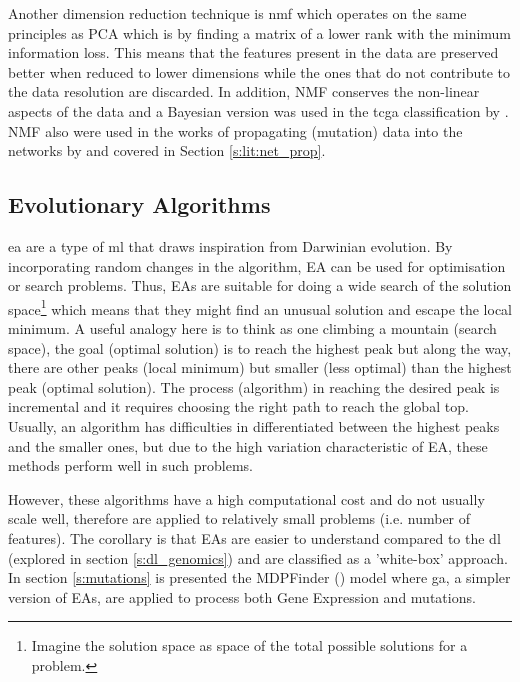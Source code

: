 Another dimension reduction technique is \acrfull{nmf} which operates on the same principles as PCA which is by finding a matrix of a lower rank with the minimum information loss. This means that the features present in the data are preserved better when reduced to lower dimensions while the ones that do not contribute to the data resolution are discarded. In addition, NMF conserves the non-linear aspects of the data and a Bayesian version was used in the \acrfull{tcga} classification by \citet{Robertson2017-mg}. NMF also were used in the works of propagating (mutation) data into the networks by \citet{Yang2016-dm, Cai2008-fv} and covered in Section \ref{s:lit:net_prop}.



\subsection{Evolutionary Algorithms} \label{s:ea_overiew}


\acrlong{ea} are a type of \acrshort{ml} that draws inspiration from Darwinian evolution. By incorporating random changes in the algorithm, EA can be used for optimisation or search problems. Thus, EAs are suitable for doing a wide search of the solution space\footnote{Imagine the solution space as space of the total possible solutions for a problem.} which means that they might find an unusual solution and escape the local minimum. A useful analogy here is to think as one climbing a mountain (search space), the goal (optimal solution) is to reach the highest peak but along the way, there are other peaks (local minimum) but smaller (less optimal) than the highest peak (optimal solution). The process (algorithm) in reaching the desired peak is incremental and it requires choosing the right path to reach the global top. Usually, an algorithm has difficulties in differentiated between the highest peaks and the smaller ones, but due to the high variation characteristic of EA, these methods perform well in such problems.


However, these algorithms have a high computational cost and do not usually scale well, therefore are applied to relatively small problems (i.e. number of features). The corollary is that EAs are easier to understand compared to the  \acrfull{dl} (explored in section \ref{s:dl_genomics}) and are classified as a 'white-box' approach. In section \ref{s:mutations} is presented the MDPFinder (\citet{Zhao2012-wj}) model where \acrfull{ga}, a simpler version of EAs, are applied to process both Gene Expression and mutations.

